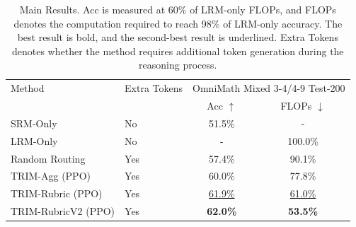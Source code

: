 \begin{table}[t]
\centering
\small
\begin{tabular}{llcc}
\toprule
Method & Extra Tokens & \multicolumn{2}{c}{OmniMath Mixed 3-4/4-9 Test-200} &  \\
 &  & Acc $\uparrow$ & FLOPs $\downarrow$ \\
\midrule
SRM-Only & No & 51.5\% & - \\
LRM-Only & No & - & 100.0\% \\
Random Routing & Yes & 57.4\% & 90.1\% \\
TRIM-Agg (PPO) & Yes & 60.0\% & 77.8\% \\
TRIM-Rubric (PPO) & Yes & \underline{61.9\%} & \underline{61.0\%} \\
TRIM-RubricV2 (PPO) & Yes & \textbf{62.0\%} & \textbf{53.5\%} \\
\bottomrule
\end{tabular}
\caption{Main Results. Acc is measured at 60\% of LRM-only FLOPs, and FLOPs denotes the computation required to reach 98\% of LRM-only accuracy. The best result is bold, and the second-best result is underlined. Extra Tokens denotes whether the method requires additional token generation during the reasoning process.}
\end{table}
